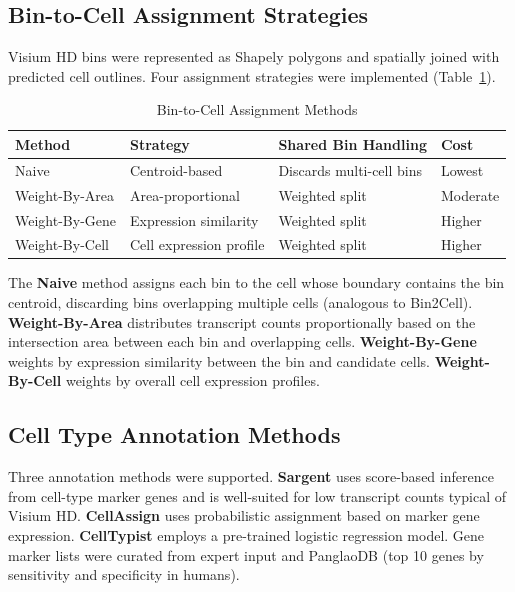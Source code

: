 \documentclass[11pt]{article}
\begin{document}
\subsection{Bin-to-Cell Assignment Strategies}

Visium HD bins were represented as Shapely polygons and spatially joined with predicted cell outlines. Four assignment strategies were implemented (Table~\ref{tab:methods}).

\begin{table}[ht]
\centering
\caption{Bin-to-Cell Assignment Methods}
\label{tab:methods}
\begin{tabular}{llll}
\toprule
\textbf{Method} & \textbf{Strategy} & \textbf{Shared Bin Handling} & \textbf{Cost} \\
\midrule
Naive & Centroid-based & Discards multi-cell bins & Lowest \\
Weight-By-Area & Area-proportional & Weighted split & Moderate \\
Weight-By-Gene & Expression similarity & Weighted split & Higher \\
Weight-By-Cell & Cell expression profile & Weighted split & Higher \\
\bottomrule
\end{tabular}
\end{table}

The \textbf{Naive} method assigns each bin to the cell whose boundary contains the bin centroid, discarding bins overlapping multiple cells (analogous to Bin2Cell). \textbf{Weight-By-Area} distributes transcript counts proportionally based on the intersection area between each bin and overlapping cells. \textbf{Weight-By-Gene} weights by expression similarity between the bin and candidate cells. \textbf{Weight-By-Cell} weights by overall cell expression profiles.

\subsection{Cell Type Annotation Methods}

Three annotation methods were supported. \textbf{Sargent} \citep{sargent2023celltype} uses score-based inference from cell-type marker genes and is well-suited for low transcript counts typical of Visium HD. \textbf{CellAssign} \citep{zhang2023cellassign} uses probabilistic assignment based on marker gene expression. \textbf{CellTypist} \citep{dominguez2022celltypist} employs a pre-trained logistic regression model. Gene marker lists were curated from expert input and PanglaoDB \citep{franzen2019panglaodb} (top 10 genes by sensitivity and specificity in humans).
\end{document}
